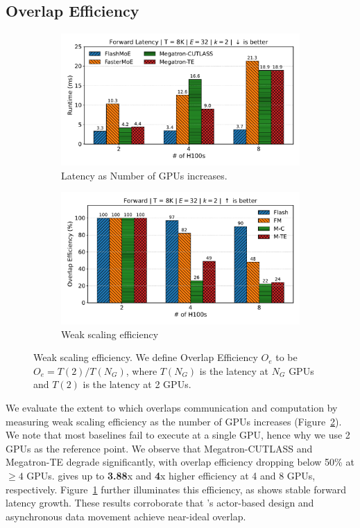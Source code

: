 \subsection{Overlap Efficiency}\label{subsec:overlap-efficiency}
\begin{figure}[!h]
    \centering
    \begin{subfigure}{0.49\textwidth}
        \centering
        \includegraphics[width=\linewidth, keepaspectratio]{flash_figs/scaling_gpus_8}
        \caption{Latency as Number of GPUs increases.}
        \label{fig:lng}
    \end{subfigure}
    \begin{subfigure}{0.49\textwidth}
        \centering
        \includegraphics[width=\linewidth, keepaspectratio]{flash_figs/overlap_efficiency_8}
        \caption{Weak scaling efficiency}
        \label{fig:oe}
    \end{subfigure}
    \caption{Weak scaling efficiency. We define Overlap Efficiency $O_e$
        to be $O_e = T(2) / T(N_G)$, where $T(N_G)$ is the latency at $N_G$ GPUs and $T(2)$ is the latency at 2 GPUs.}
    \label{fig:oet}
\end{figure}
We evaluate the extent to which \sysname overlaps communication and computation by measuring weak scaling efficiency
as the number of GPUs increases (Figure~\ref{fig:oe}).
We note that most baselines fail to execute at a single GPU, hence why we use 2 GPUs as the reference point.
We observe that Megatron-CUTLASS and Megatron-TE degrade significantly,
with overlap efficiency dropping below 50\% at $\geq 4$ GPUs. \sysname gives up to \textbf{3.88}x and
\textbf{4}x higher efficiency at 4 and 8 GPUs, respectively.
Figure~\ref{fig:lng} further illuminates this efficiency, as \sysname shows stable forward latency growth.
These results corroborate that \sysname's actor-based design and asynchronous data movement
achieve near-ideal overlap.
